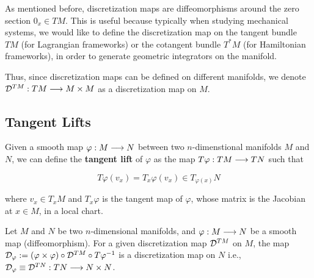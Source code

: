 As mentioned before, discretization maps are diffeomorphisms around the zero section $0_x \in TM$. 
This is useful because typically when studying mechanical systems, we would like to define the discretization map on the tangent bundle $TM$ (for Lagrangian frameworks) or the cotangent bundle $T^*M$ (for Hamiltonian frameworks), in order to generate geometric integrators on the manifold.

Thus, since discretization maps can be defined on different manifolds, we denote $\mathcal{D}^{TM} : TM \longrightarrow M \times M$ as a discretization map on $M$.

\subsection{Tangent Lifts}

Given a smooth map $\varphi: M \longrightarrow N$ between two $n$-dimenstional manifolds $M$ and $N$, we can define the \textbf{tangent lift} of $\varphi$ as the map $T\varphi: TM \longrightarrow TN$ such that

\[
  T\varphi(v_x) = T_x \varphi(v_x) \in T_{\varphi(x)} N
\]

where $v_x \in T_x M$ and $T_x\varphi$ is the tangent map of $\varphi$, whose matrix is the Jacobian at $x \in M$, in a local chart.

\begin{prop}
  \label{prop:retr-lift}
Let $M$ and $N$ be two $n$-dimensional manifolds, and $\varphi: M \longrightarrow N$ be a smooth map (diffeomorphism). For a given discretization map $\mathcal{D}^{TM}$ on $M$, the map $\mathcal{D}_{\varphi} :=  (\varphi \times \varphi) \circ \mathcal{D}^{TM} \circ T \varphi ^{-1}$ is a discretization map on $N$ i.e., $\mathcal{D}_{\varphi} \equiv \mathcal{D}^{TN} : TN \longrightarrow N \times N$.
\end{prop}


